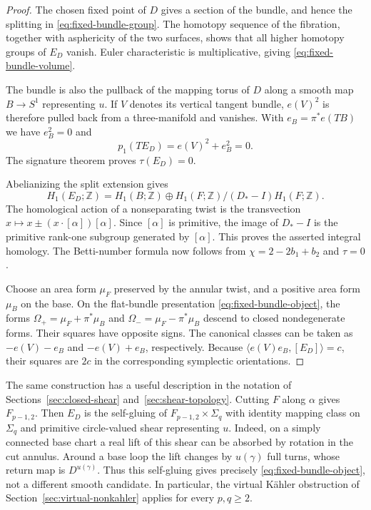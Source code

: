 \begin{proof}
The chosen fixed point of $D$ gives a section of the bundle, and hence
the splitting in \eqref{eq:fixed-bundle-group}.  The homotopy sequence
of the fibration, together with asphericity of the two surfaces, shows
that all higher homotopy groups of $E_D$ vanish.  Euler characteristic
is multiplicative, giving \eqref{eq:fixed-bundle-volume}.

The bundle is also the pullback of the mapping torus of $D$ along a
smooth map $B\to S^1$ representing $u$.  If $V$ denotes its vertical
tangent bundle, $e(V)^2$ is therefore pulled back from a three-manifold
and vanishes.  With $e_B=\pi^*e(TB)$ we have $e_B^2=0$ and
\[
 p_1(TE_D)=e(V)^2+e_B^2=0.
\]
The signature theorem proves $\tau(E_D)=0$.

Abelianizing the split extension gives
\[
 H_1(E_D;\mathbb Z)
 =H_1(B;\mathbb Z)\oplus
   H_1(F;\mathbb Z)/(D_*-I)H_1(F;\mathbb Z).
\]
The homological action of a nonseparating twist is the transvection
$x\mapsto x\pm(x\cdot[\alpha])[\alpha]$.  Since $[\alpha]$ is
primitive, the image of $D_*-I$ is the primitive rank-one subgroup
generated by $[\alpha]$.  This proves the asserted integral homology.
The Betti-number formula now follows from $\chi=2-2b_1+b_2$ and
$\tau=0$.

Choose an area form $\mu_F$ preserved by the annular twist, and a
positive area form $\mu_B$ on the base.  On the flat-bundle presentation
\eqref{eq:fixed-bundle-object}, the forms
$\Omega_+=\mu_F+\pi^*\mu_B$ and
$\Omega_-=\mu_F-\pi^*\mu_B$ descend to closed nondegenerate forms.
Their squares have opposite signs.  The canonical classes can be taken
as $-e(V)-e_B$ and $-e(V)+e_B$, respectively.  Because
$\langle e(V)e_B,[E_D]\rangle=c$, their squares are $2c$ in the
corresponding symplectic orientations.
\end{proof}

The same construction has a useful description in the notation of
Sections~\ref{sec:closed-shear} and~\ref{sec:shear-topology}.
Cutting $F$ along $\alpha$ gives $F_{p-1,2}$.  Then $E_D$ is the
self-gluing of $F_{p-1,2}\times\Sigma_q$ with identity mapping class
on $\Sigma_q$ and primitive circle-valued shear representing $u$.
Indeed, on a simply connected base chart a real lift of this shear
can be absorbed by rotation in the cut annulus.  Around a base loop
the lift changes by $u(\gamma)$ full turns, whose return map is
$D^{u(\gamma)}$.  Thus this self-gluing gives precisely
\eqref{eq:fixed-bundle-object}, not a different smooth candidate.
In particular, the virtual K\"ahler obstruction of
Section~\ref{sec:virtual-nonkahler} applies for every $p,q\ge2$.

